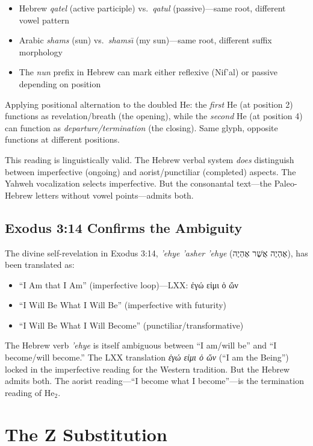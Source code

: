 \documentclass[12pt]{article}
\begin{document}
\begin{itemize}
\item Hebrew \textit{qatel} (active participle) vs.\ \textit{qatul} (passive)---same root, different vowel pattern
\item Arabic \textit{shams} (sun) vs.\ \textit{shams\={\i}} (my sun)---same root, different suffix morphology
\item The \textit{nun} prefix in Hebrew can mark either reflexive (Nif'al) or passive depending on position
\end{itemize}

Applying positional alternation to the doubled He: the \textit{first} He (at position 2) functions as revelation/breath (the opening), while the \textit{second} He (at position 4) can function as \textit{departure/termination} (the closing). Same glyph, opposite functions at different positions.

This reading is linguistically valid. The Hebrew verbal system \textit{does} distinguish between imperfective (ongoing) and aorist/punctiliar (completed) aspects. The Yahweh vocalization selects imperfective. But the consonantal text---the Paleo-Hebrew letters without vowel points---admits both.

\subsection{Exodus 3:14 Confirms the Ambiguity}

The divine self-revelation in Exodus 3:14, \textit{'ehye 'asher 'ehye} (אֶהְיֶה אֲשֶׁר אֶהְיֶה), has been translated as:

\begin{itemize}
\item ``I Am that I Am'' (imperfective loop)---LXX: ἐγώ εἰμι ὁ ὤν
\item ``I Will Be What I Will Be'' (imperfective with futurity)
\item ``I Will Be What I Will Become'' (punctiliar/transformative)
\end{itemize}

The Hebrew verb \textit{'ehye} is itself ambiguous between ``I am/will be'' and ``I become/will become.'' The LXX translation \textit{ἐγώ εἰμι ὁ ὤν} (``I am the Being'') locked in the imperfective reading for the Western tradition. But the Hebrew admits both. The aorist reading---``I become what I become''---is the termination reading of He$_2$.

\section{The Z Substitution}
\end{document}
